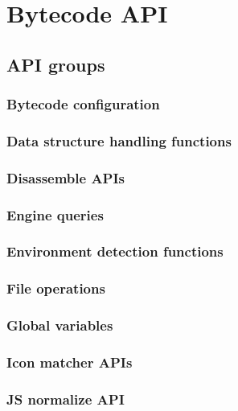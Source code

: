 \chapter{Bytecode API}
\setlength{\parindent}{0pt}
\section{API groups}
\subsection{Bytecode configuration}
\label{config}
\hypertarget{config}{}

\subsection{Data structure handling functions}
\label{adt}
\hypertarget{adt}{}

\subsection{Disassemble APIs}
\label{disasm}
\hypertarget{disasm}{}

\subsection{Engine queries}
\label{engineq}
\hypertarget{engineq}{}

\subsection{Environment detection functions}
\label{envdet}
\hypertarget{envdet}{}

\subsection{File operations}
\label{fileops}
\hypertarget{fileops}{}

\subsection{Global variables}
\label{globals}
\hypertarget{globals}{}

\subsection{Icon matcher APIs}
\label{icon}
\hypertarget{icon}{}

\subsection{JS normalize API}
\label{js}
\hypertarget{js}{}

